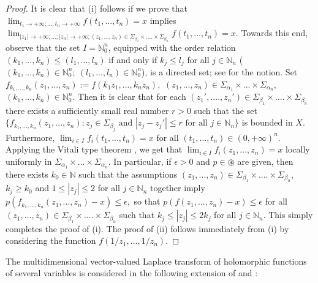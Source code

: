 \documentclass{amsart}
\theoremstyle{definition}
\theoremstyle{remark}
\numberwithin{equation}{section}
\begin{document}
\begin{proof}
It is clear that (i) follows if we prove that $\lim_{t_{1}\rightarrow +\infty;...;t_{n}\rightarrow +\infty}f(t_{1},...,t_{n})=x$ implies $\lim_{|z_{1}|\rightarrow +\infty;...;|z_{n}|\rightarrow +\infty; (z_{1},...,z_{n})\in \Sigma_{\beta_{1}}\times .... \times \Sigma_{\beta_{n}}}f(t_{1},...,t_{n})=x.$ Towards this end, observe that the set $I={\mathbb N}_{0}^{n}$, equipped with the order relation $(k_{1},...,k_{n}) \leq (l_{1},...,l_{n})$ if and only if $k_{j}\leq l_{j}$ for all $j\in {\mathbb N}_{ n}$ ($(k_{1},...,k_{n}) \in {\mathbb N}_{0}^{n};\  (l_{1},...,l_{n})\in {\mathbb N}_{0}^{n}$), is a directed set; see  \cite[p. 9]{meise} for the notion. Set $f_{k_{1},...,k_{n}}(z_{1},...,z_{n}):=f(k_{1}z_{1},...,k_{n}z_{n}),$ $(z_{1},...,z_{n}) \in \Sigma_{\alpha_{1}} \times ... \times  \Sigma_{\alpha_{n}},$ $(k_{1},...,k_{n}) \in {\mathbb N}_{0}^{n}.$  Then it is clear that for each $(z_{1}',....,z_{n}')\in \Sigma_{\beta_{1}}\times .... \times \Sigma_{\beta_{n}}$ there exists a sufficiently small real number $r>0$ such that the set $\{ f_{k_{1},...,k_{n}}(z_{1},...,z_{n}) : z_{j}\in \Sigma_{\beta_{j}}\mbox{ and }|z_{j}-z_{j}'|\leq r \mbox{ for all }j\in {\mathbb N}_{n}\}$ is bounded in $X.$ Furthermore, $\lim_{i\in I}f_{i}(t_{1},...,t_{n})=x$ for all $(t_{1},...,t_{n})\in (0,+\infty)^{n}.$ Applying the Vitali type theorem \cite[Theorem 3]{jorda}, we get that $\lim_{i\in I}f_{i}(z_{1},...,z_{n})=x$ locally uniformly in $\Sigma_{\alpha_{1}} \times ... \times  \Sigma_{\alpha_{n}}.$  In particular, if $\epsilon>0$ and $p\in  \circledast$ are given, then there exists $k_{0}\in {\mathbb N}$ such that the assumptions $(z_{1},...,z_{n})\in \Sigma_{\beta_{1}}\times .... \times \Sigma_{\beta_{n}}$, $k_{j}\geq k_{0}$  and $1\leq |z_{j}|\leq 2$ for all $j\in {\mathbb N}_{n}$ together imply $p(f_{k_{1},...,k_{n}}(z_{1},...,z_{n})-x)\leq \epsilon,$ so that $p(f(z_{1},...,z_{n})-x)\leq \epsilon$ for all $(z_{1},...,z_{n})\in \Sigma_{\beta_{1}}\times .... \times \Sigma_{\beta_{n}}$ such that $k_{j}\leq |z_{j}|\leq 2k_{j}$  for all $j\in {\mathbb N}_{n}$. This simply completes the proof of (i).
The proof of (ii) follows immediately from (i) by considering the function $f(1/z_{1},...,1/z_{n}).$
\end{proof}

The multidimensional vector-valued Laplace transform of holomorphic functions of several variables is considered in the following extension of \cite[Theorem 2.6.1]{a43} and \cite[Theorem 1.4.10(i)]{FKP}:
\end{document}
